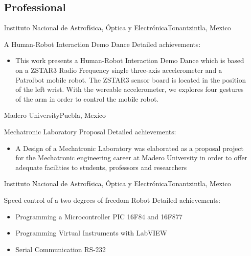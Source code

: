 \documentclass[10pt,a4paper,sans]{moderncv}
\begin{document}
\subsection{Professional}

{Instituto Nacional de Astrof\'isica, \'Optica y Electr\'onica}{Tonantzintla, Mexico}{}
{A Human-Robot Interaction Demo Dance 
\newline{}
Detailed achievements:%
\begin{itemize}%
\item This work presents a Human-Robot Interaction Demo Dance which is based on a 
ZSTAR3 Radio Frequency single three-axis accelerometer and a Patrolbot mobile robot. 
The ZSTAR3 sensor board is located in the position of the left wrist. With the wereable accelerometer, 
we explores four gestures of the arm in order to control the mobile robot.
\href{https://sites.google.com/site/perezxochicale/projects/demodance}{\faGlobe}
\end{itemize}
}


{Madero University}{Puebla, Mexico}{}
{Mechatronic Laboratory Proposal
\newline{}
Detailed achievements:%
\begin{itemize}%
\item A Design of a Mechatronic Laboratory was elaborated as a proposal project for the
  Mechatronic engineering career at Madero University in order to offer adequate
  facilities to students, professors and researchers
  \href{https://sites.google.com/site/perezxochicaleprojects/mechatronicslaboratorydesign}{\faGlobe}
\end{itemize}
}


{Instituto Nacional de Astrof\'isica, \'Optica y Electr\'onica}{Tonantzintla, Mexico}{}
{Speed control of a two degrees of freedom Robot
\newline{}
Detailed achievements:%
\begin{itemize}%
\item Programming a Microcontroller PIC 16F84 and 16F877
\item Programming Virtual Instruments with LabVIEW
\item Serial Communication RS-232
\end{itemize}
}
\end{document}
